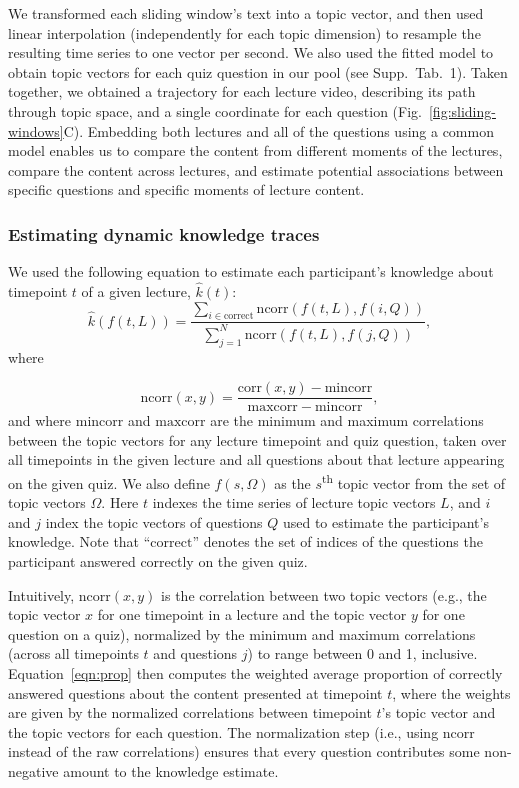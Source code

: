 \documentclass[10pt]{article}
\newcommand{\questions}{1}
\begin{document}
We transformed each sliding window's text into a topic vector, and then used
linear interpolation (independently for each topic dimension) to resample the
resulting time series to one vector per second. We also used the fitted model to
obtain topic vectors for each quiz question in our pool (see Supp.~Tab.~\questions).
Taken together, we obtained a trajectory for each lecture video, describing
its path through topic space, and a single coordinate for each question
(Fig.~\ref{fig:sliding-windows}C). Embedding both lectures and all of the
questions using a common model enables us to compare the content from different
moments of the lectures, compare the content across lectures, and estimate potential
associations between specific questions and specific moments of lecture content.


\subsubsection*{Estimating dynamic knowledge traces}\label{subsec:traces}

We used the following equation to estimate each participant's knowledge about
timepoint $t$ of a given lecture, $\hat{k}(t)$:
\begin{equation}
    \hat{k}\left(f(t, L)\right) = \frac{\sum_{i \in \mathrm{correct}}\mathrm{ncorr}\left(f(t, L), f(i, Q)\right)}{\sum_{j = 1}^N \mathrm{ncorr}\left(f(t, L), f(j, Q)\right)},
    \label{eqn:prop}
\end{equation}
where

\begin{equation}
    \mathrm{ncorr}(x, y) = \frac{\mathrm{corr}(x, y) - \mathrm{mincorr}}{\mathrm{maxcorr} - \mathrm{mincorr}},
\end{equation}
and where $\mathrm{mincorr}$ and $\mathrm{maxcorr}$ are the minimum and maximum
correlations between the topic vectors for any lecture timepoint and quiz question, taken over all
timepoints in the given lecture and all questions about that
lecture appearing on the given quiz. We also define $f(s, \Omega)$ as the
$s$\textsuperscript{th} topic vector from the set of topic vectors $\Omega$.
Here $t$ indexes the time series of lecture topic vectors $L$, and $i$ and $j$ index
the topic vectors of questions $Q$ used to estimate the participant's knowledge. Note
that ``$\mathrm{correct}$'' denotes the set of indices of the questions the
participant answered correctly on the given quiz.

Intuitively, $\mathrm{ncorr}(x, y)$ is the correlation between two topic
vectors (e.g., the topic vector $x$ for one timepoint in a lecture and the
topic vector $y$ for one question on a quiz), normalized by the minimum and
maximum correlations (across all timepoints $t$ and questions $j$) to range
between 0 and 1, inclusive. Equation~\ref{eqn:prop} then computes the weighted
average proportion of correctly answered questions about the content presented
at timepoint $t$, where the weights are given by the normalized correlations
between timepoint $t$'s topic vector and the topic vectors for each question.
The normalization step (i.e., using $\mathrm{ncorr}$ instead of the raw
correlations) ensures that every question contributes some non-negative amount
to the knowledge estimate.
\end{document}
